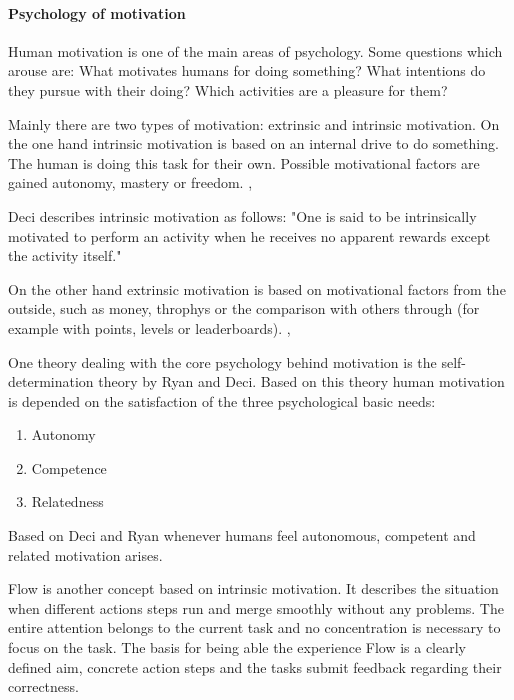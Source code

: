 \paragraph*{Psychology of motivation}
Human motivation is one of the main areas of psychology. Some questions which arouse are: What motivates humans for doing something? What intentions do they pursue with their doing? Which activities are a pleasure for them? \cite[p. 1]{bierhoffeditorEnzyklopaediePsychologieSoziale2016}

Mainly there are two types of motivation: extrinsic and intrinsic motivation. 
On the one hand intrinsic motivation is based on an internal drive to do something. The human is doing this task for their own. Possible motivational factors are gained autonomy, mastery or freedom. \cite[p. 2, 3, 4]{bierhoffeditorEnzyklopaediePsychologieSoziale2016}, \cite[p. 60, 61]{inproceedings}

Deci describes intrinsic motivation as follows: "One is said to be intrinsically motivated to perform an activity when he receives no apparent rewards except the activity itself." \cite[p. 105]{deciEffectsExternallyMediated1971}

On the other hand extrinsic motivation is based on motivational factors from the outside, such as money, throphys or the comparison with others through (for example with points, levels or leaderboards). \cite[p. 2, 3, 4]{bierhoffeditorEnzyklopaediePsychologieSoziale2016}, \cite[p. 60, 61]{inproceedings}

\label{selfDeterminationTheory}
One theory dealing with the core psychology behind motivation is the self-determination theory by Ryan and Deci. Based on this theory human motivation is depended on the satisfaction of the three psychological basic needs: 
\begin{enumerate}
	\item Autonomy
	\item Competence
	\item Relatedness
\end{enumerate} 
Based on Deci and Ryan whenever humans feel autonomous, competent and related motivation arises. \cite[p. 416-432]{deciTheoriesSocialPsychology2019}

Flow is another concept based on intrinsic motivation. It describes the situation when different actions steps run and merge smoothly without any problems. The entire attention belongs to the current task and no concentration is necessary to focus on the task. The basis for being able the experience Flow is a clearly defined aim, concrete action steps and the tasks submit feedback regarding their correctness. \cite[p. 19, 20, 21]{bierhoffeditorEnzyklopaediePsychologieSoziale2016}

